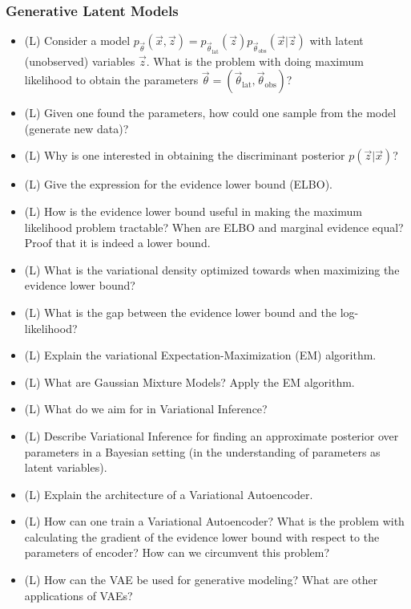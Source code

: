 \subsubsection*{Generative Latent Models}
\begin{itemize}
    \item (L) Consider a model $p_\vec{\theta}(\vec{x},\vec{z}) = p_{\vec{\theta}_{\text{lat}}}(\vec{z}) p_{\vec{\theta}_{\text{obs}}}(\vec{x} | \vec{z})$ with latent (unobserved) variables $\vec{z}$.
    What is the problem with doing maximum likelihood to obtain the parameters $\vec{\theta} = (\vec{\theta}_{\text{lat}}, \vec{\theta}_{\text{obs}})$?
    \answerboxM
    \item (L) Given one found the parameters, how could one sample from the model (generate new data)?
    \answerboxM
    \item (L) Why is one interested in obtaining the discriminant posterior $p(\vec{z} | \vec{x})$?
    \answerboxM
    \item (L) Give the expression for the evidence lower bound (ELBO).
    \answerboxM
    \item (L) How is the evidence lower bound useful in making the maximum likelihood problem tractable? When are ELBO and marginal evidence equal? Proof that it is indeed a lower bound.
    \answerboxM
    \item (L) What is the variational density optimized towards when maximizing the evidence lower bound?
    \answerboxM
    \item (L) What is the gap between the evidence lower bound and the log-likelihood?
    \answerboxM
    \item (L) Explain the variational Expectation-Maximization (EM) algorithm.
    \answerboxM
    \item (L) What are Gaussian Mixture Models? Apply the EM algorithm.
    \answerboxL
    \item (L) What do we aim for in Variational Inference?
    \answerboxM
    \item (L) Describe Variational Inference for finding an approximate posterior over parameters in a Bayesian setting (in the understanding of parameters as latent variables).
    \answerboxL
    \item (L) Explain the architecture of a Variational Autoencoder.
    \answerboxL
    \item (L) How can one train a Variational Autoencoder? What is the problem with calculating the gradient of the evidence lower bound with
    respect to the parameters of encoder? How can we circumvent this problem?
    \answerboxL
    \item (L) How can the VAE be used for generative modeling? What are other applications of VAEs?
    \answerboxM
\end{itemize}

\pagebreak